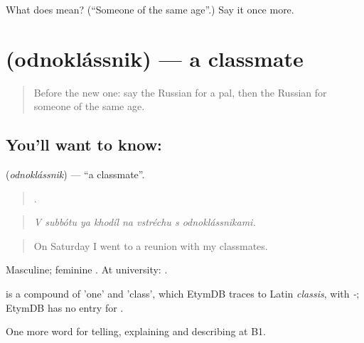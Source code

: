 \begin{tcolorbox}[breakable,colback=teal!4,colframe=teal!35!black,title={Before you move on}]
What does  mean? (\textquotedblleft{}Someone of the same age\textquotedblright{}.) Say it once more.
\end{tcolorbox}
\section[\texorpdfstring{\ru{одноклассник} (odnoklássnik)}{одноклассник (odnoklássnik)}]{ (odnoklássnik) — a classmate}

\label{lesson:RU-C498-odnoklassnik}



\begin{quote}
Before the new one: say the Russian for a pal, then the Russian for someone of the same age.
\end{quote}

\subsection*{You'll want to know: }
\textbf{} (\emph{odnoklássnik}) — \textquotedblleft{}a classmate\textquotedblright{}.

\begin{quote}
       .
\end{quote}

\begin{quote}
\emph{V subbótu ya khodíl na vstréchu s odnoklássnikami.}
\end{quote}

\begin{quote}
On Saturday I went to a reunion with my classmates.
\end{quote}

Masculine; feminine . At university: \emph{}.

\begin{cousinweb}
\emph{} is a compound of \emph{} 'one' and \emph{} 'class', which EtymDB traces to Latin \emph{classis}, with \emph{-}; EtymDB has no entry for \emph{}.
\end{cousinweb}

\begin{grammarlens}[title={What you've built}]
One more word for telling, explaining and describing at B1.
\end{grammarlens}


